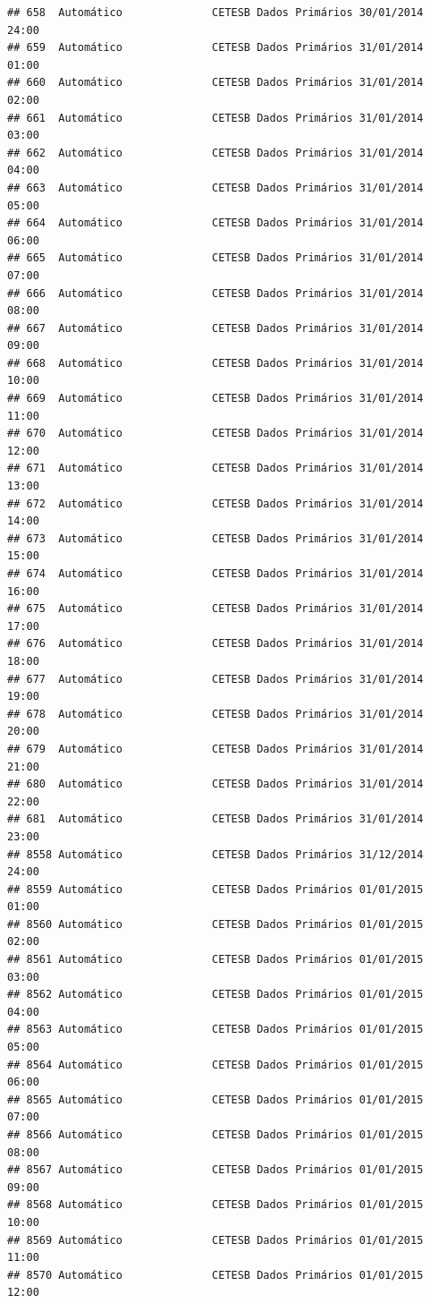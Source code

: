 \documentclass[]{book}
\begin{document}
\begin{verbatim}
## 658  Automático              CETESB Dados Primários 30/01/2014 24:00
## 659  Automático              CETESB Dados Primários 31/01/2014 01:00
## 660  Automático              CETESB Dados Primários 31/01/2014 02:00
## 661  Automático              CETESB Dados Primários 31/01/2014 03:00
## 662  Automático              CETESB Dados Primários 31/01/2014 04:00
## 663  Automático              CETESB Dados Primários 31/01/2014 05:00
## 664  Automático              CETESB Dados Primários 31/01/2014 06:00
## 665  Automático              CETESB Dados Primários 31/01/2014 07:00
## 666  Automático              CETESB Dados Primários 31/01/2014 08:00
## 667  Automático              CETESB Dados Primários 31/01/2014 09:00
## 668  Automático              CETESB Dados Primários 31/01/2014 10:00
## 669  Automático              CETESB Dados Primários 31/01/2014 11:00
## 670  Automático              CETESB Dados Primários 31/01/2014 12:00
## 671  Automático              CETESB Dados Primários 31/01/2014 13:00
## 672  Automático              CETESB Dados Primários 31/01/2014 14:00
## 673  Automático              CETESB Dados Primários 31/01/2014 15:00
## 674  Automático              CETESB Dados Primários 31/01/2014 16:00
## 675  Automático              CETESB Dados Primários 31/01/2014 17:00
## 676  Automático              CETESB Dados Primários 31/01/2014 18:00
## 677  Automático              CETESB Dados Primários 31/01/2014 19:00
## 678  Automático              CETESB Dados Primários 31/01/2014 20:00
## 679  Automático              CETESB Dados Primários 31/01/2014 21:00
## 680  Automático              CETESB Dados Primários 31/01/2014 22:00
## 681  Automático              CETESB Dados Primários 31/01/2014 23:00
## 8558 Automático              CETESB Dados Primários 31/12/2014 24:00
## 8559 Automático              CETESB Dados Primários 01/01/2015 01:00
## 8560 Automático              CETESB Dados Primários 01/01/2015 02:00
## 8561 Automático              CETESB Dados Primários 01/01/2015 03:00
## 8562 Automático              CETESB Dados Primários 01/01/2015 04:00
## 8563 Automático              CETESB Dados Primários 01/01/2015 05:00
## 8564 Automático              CETESB Dados Primários 01/01/2015 06:00
## 8565 Automático              CETESB Dados Primários 01/01/2015 07:00
## 8566 Automático              CETESB Dados Primários 01/01/2015 08:00
## 8567 Automático              CETESB Dados Primários 01/01/2015 09:00
## 8568 Automático              CETESB Dados Primários 01/01/2015 10:00
## 8569 Automático              CETESB Dados Primários 01/01/2015 11:00
## 8570 Automático              CETESB Dados Primários 01/01/2015 12:00

\end{verbatim}
\end{document}
